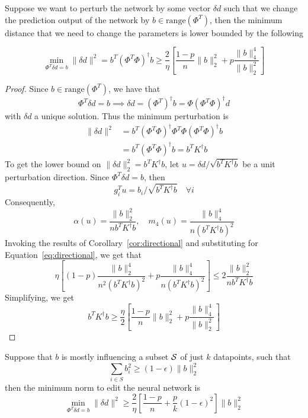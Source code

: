 \begin{theorem}
Suppose we want to perturb the network by some vector $\delta d$ such that we change the prediction output of the network by $b \in \text{range}(\Phi^T)$, then the minimum distance that we need to change the parameters is lower bounded by the following

\[\min_{\Phi^T\delta d = b} \|\delta d\|^2 = b^T(\Phi^T\Phi)^\dagger b \geq \frac2\eta \left[ \frac{1-p}{n}\|b\|_2^2 + p\frac{\|b\|_4^4}{\|b\|_2^2} \right]\]
\end{theorem}
\begin{proof}
    Since $b\in \text{range}(\Phi^T)$, we have that 
    \[\Phi^T\delta d = b \implies \delta d = (\Phi^T)^\dagger b = \Phi(\Phi^T \Phi)^\dagger d\]
    with $\delta d$ a unique solution. Thus the minimum perturbation is 
    \begin{align}
        \|\delta d\|^2 &= b^T (\Phi^T \Phi)^\dagger\Phi^T\Phi(\Phi^T \Phi)^\dagger b \\
        &= b^T(\Phi^T \Phi)^\dagger b = b^TK^\dagger b
    \end{align}
    To get the lower bound on $\|\delta d\|_2^2 =  b^TK^\dagger b$, let $u = \delta d/ \sqrt{b^TK^\dagger b}$ be a unit perturbation direction. 
    Since $\Phi^T\delta d = b$, then 
    \[g_i^Tu = b_i/\sqrt{b^TK^\dagger b} \quad \forall i\]
    Consequently,
    \[\alpha(u) = \frac{\|b\|_2^2}{nb^TK^\dagger b}, \quad m_4(u) = \frac{\|b\|_4^4}{n (b^TK^\dagger b)^2}\]
    Invoking the results of Corollary~\ref{cor:directional} and substituting for Equation~\ref{eq:directional}, we get that 
    \[\eta \left[ (1-p)\frac{\|b\|_2^4}{n^2(b^TK^\dagger b)^2}+p \frac{\|b\|_4^4}{n (b^TK^\dagger b)^2} \right] \leq 2\frac{\|b\|_2^2}{nb^TK^\dagger b}\]
    Simplifying, we get 
    \[b^TK^\dagger b \geq \frac\eta2 \left[ \frac{1-p}{n}\|b\|_2^2 + p\frac{\|b\|_4^4}{\|b\|_2^2} \right]\]
\end{proof}

\begin{corollary}
Suppose that $b$ is mostly influencing a subset $\mathcal{S}$ of just $k$ datapoints, such that
\begin{equation}
    \sum_{i\in S}b_i^2 \geq (1-\epsilon)\|b\|_2^2
\end{equation}
then the minimum norm to edit the neural network is 
\begin{equation}
    \min_{\Phi^T\delta d = b} \|\delta d\|^2 \geq \frac2\eta \left[\frac{1-p}{n} + \frac{p}{k}(1-\epsilon)^2 \right] \|b\|_2^2
\end{equation}
\end{corollary}

